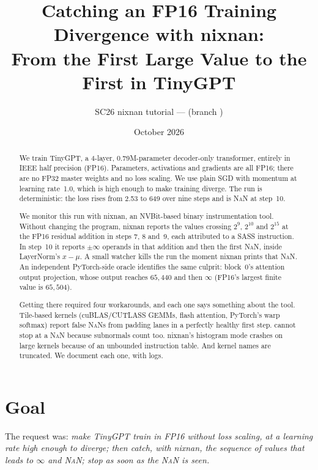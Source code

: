 \documentclass[10pt]{article}
\title{Catching an FP16 Training Divergence with nixnan:\\
From the First Large Value to the First \NaN{} in TinyGPT}
\author{SC26 nixnan tutorial --- \code{flash-attn-expt/fp16-divergence} (branch \code{Flash-Attn})}
\date{October 2026}
\newcommand{\code}[1]{\texttt{\detokenize{#1}}}
\newcommand{\NaN}{\textsc{NaN}}
\begin{document}
\maketitle

\begin{abstract}
We train TinyGPT, a 4-layer, 0.79M-parameter decoder-only transformer, entirely in IEEE half
precision (FP16). Parameters, activations and gradients are all FP16; there are no FP32 master
weights and no loss scaling. We use plain SGD with momentum at learning rate~1.0, which is high
enough to make training diverge. The run is deterministic: the loss rises from 2.53 to 649 over nine
steps and is \NaN{} at step~10.

We monitor this run with nixnan, an NVBit-based binary instrumentation tool. Without changing the
program, nixnan reports the values crossing $2^9$, $2^{10}$ and $2^{15}$ at the FP16 residual
addition in steps 7, 8 and~9, each attributed to a SASS instruction. In step~10 it reports $\pm\infty$
operands in that addition and then the first \NaN{}, inside LayerNorm's $x-\mu$. A small watcher
kills the run the moment nixnan prints that \NaN{}. An independent PyTorch-side oracle identifies
the same culprit: block~0's attention output projection, whose output reaches $65{,}440$ and then
$\infty$ (FP16's largest finite value is $65{,}504$).

Getting there required four workarounds, and each one says something about the tool. Tile-based
kernels (cuBLAS/CUTLASS GEMMs, flash attention, PyTorch's warp softmax) report false \NaN{}s from
padding lanes in a perfectly healthy first step. \code{MAX_ERRORS} cannot stop at a \NaN{} because
subnormals count too. nixnan's histogram mode crashes on large kernels because of an unbounded
instruction table. And kernel names are truncated. We document each one, with logs.
\end{abstract}

\tableofcontents
\newpage

\section{Goal}

The request was: \emph{make TinyGPT train in FP16 without loss scaling, at a learning rate high
enough to diverge; then catch, with nixnan, the sequence of values that leads to $\infty$ and \NaN{};
stop as soon as the \NaN{} is seen.}
\end{document}
